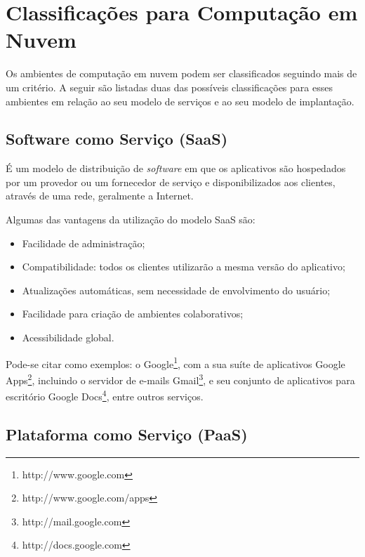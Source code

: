 \section{Classificações para Computação em Nuvem}
\label{computacaoemnuvem:classificacoes}

Os ambientes de computação em nuvem podem ser classificados seguindo mais de um
critério. A seguir são listadas duas das possíveis classificações para esses
ambientes em relação ao seu modelo de serviços e ao seu modelo de implantação.

\subsection{Software como Serviço (SaaS)} 
\label{computacaoemnuvem:classificacoes:servicos:SaaS}

É um modelo de distribuição de \textit{software} em que os aplicativos são
hospedados por um provedor ou um fornecedor de serviço e disponibilizados aos
clientes, através de uma rede, geralmente a Internet.

Algumas das vantagens da utilização do modelo SaaS são:

\begin{itemize}
\setlength{\itemsep}{1pt}
\setlength{\parskip}{0pt}
\setlength{\parsep}{0pt}
\item Facilidade de administração;
\item Compatibilidade: todos os clientes utilizarão a mesma versão do
aplicativo;
\item Atualizações automáticas, sem necessidade de envolvimento do usuário;
\item Facilidade para criação de ambientes colaborativos;
\item Acessibilidade global.
\end{itemize}
     
Pode-se citar como exemplos: o Google\footnote{http://www.google.com}, com a sua
suíte de aplicativos Google Apps\footnote{http://www.google.com/apps}, incluindo
o servidor de e-mails Gmail\footnote{http://mail.google.com}, e seu conjunto de
aplicativos para escritório Google Docs\footnote{http://docs.google.com}, entre
outros serviços.

\subsection{Plataforma como Serviço (PaaS)} 
\label{computacaoemnuvem:classificacoes:servicos:PaaS}

